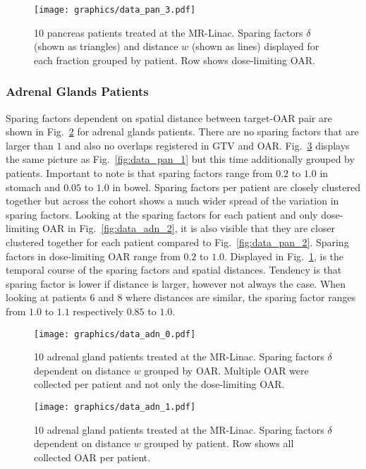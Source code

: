 \documentclass[\relativeRoot/ada.tex]{subfiles}
\begin{document}
\begin{figure}[!htb]
    \centering
    \texttt{[image: graphics/data\_pan\_3.pdf]}
    \caption{10 pancreas patients treated at the MR-Linac. Sparing factors $\delta$ (shown as triangles) and distance $w$ (shown as lines) displayed for each fraction grouped by patient. Row shows dose-limiting OAR.}
    \label{fig:data_pan_3}
\end{figure}

\subsubsection{Adrenal Glands Patients}

Sparing factors dependent on spatial distance between target-OAR pair are shown in Fig.~\ref{fig:data_adn_0} for adrenal glands patients. There are no sparing factors that are larger than $1$ and also no overlaps registered in GTV and OAR. Fig.~\ref{fig:data_adn_1} displays the same picture as Fig.~\ref{fig:data_pan_1} but this time additionally grouped by patients. Important to note is that sparing factors range from $0.2$ to $1.0$ in stomach and  $0.05$ to $1.0$ in bowel. Sparing factors per patient are closely clustered together but across the cohort shows a much wider spread of the variation in sparing factors. Looking at the sparing factors for each patient and only dose-limiting OAR in Fig.~\ref{fig:data_adn_2}, it is also visible that they are closer clustered together for each patient compared to Fig.~\ref{fig:data_pan_2}. Sparing factors in dose-limiting OAR range from $0.2$ to $1.0$. Displayed in Fig.~\ref{fig:data_pan_3}, is the temporal course of the sparing factors and spatial distances. Tendency is that sparing factor is lower if distance is larger, however not always the case. When looking at patients $6$ and $8$ where distances are similar, the sparing factor ranges from $1.0$ to $1.1$ respectively $0.85$ to $1.0$.


\begin{figure}[!htb]
    \centering
    \texttt{[image: graphics/data\_adn\_0.pdf]}
    \caption{10 adrenal gland patients treated at the MR-Linac. Sparing factors $\delta$ dependent on distance $w$ grouped by OAR. Multiple OAR were collected per patient and not only the dose-limiting OAR.}
    \label{fig:data_adn_0}
\end{figure}

\begin{figure}[!htb]
    \centering
    \texttt{[image: graphics/data\_adn\_1.pdf]}
    \caption{10 adrenal gland patients treated at the MR-Linac. Sparing factors $\delta$ dependent on distance $w$ grouped by patient. Row shows all collected OAR per patient.}
    \label{fig:data_adn_1}
\end{figure}
\end{document}
